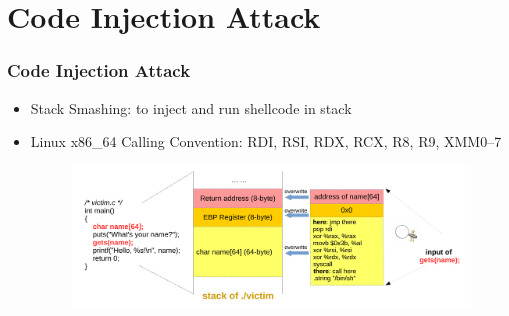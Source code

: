 \documentclass[aspectratio=169]{beamer}
\begin{document}
\section{Code Injection Attack}
\begin{frame}
\frametitle{Code Injection Attack}
\begin{itemize}
\item Stack Smashing: to inject and run shellcode in stack
\item Linux x86\_64 Calling Convention: RDI, RSI, RDX, RCX, R8, R9, XMM0–7
\begin{figure}
\includegraphics[width=1.0\linewidth]{figures/injection.pdf}
\end{figure}
\end{itemize}
\end{frame}

\end{document}
